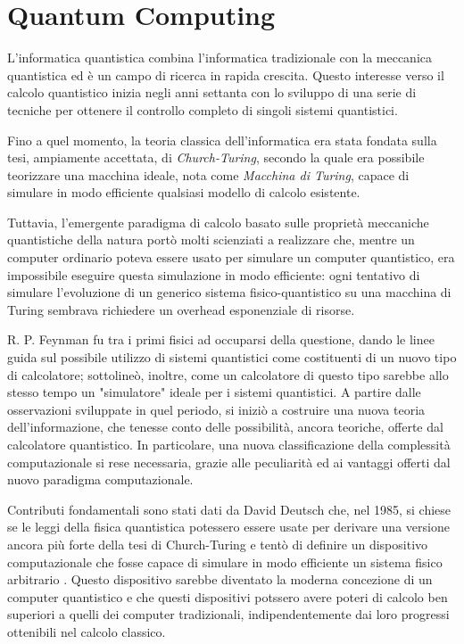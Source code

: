 \chapter{Quantum Computing}
L'informatica quantistica combina l'informatica tradizionale con la meccanica quantistica ed è un campo di ricerca in rapida crescita. Questo interesse verso il calcolo quantistico inizia negli anni settanta con lo sviluppo di una serie di tecniche per ottenere il controllo completo di singoli sistemi quantistici. 

Fino a quel momento, la teoria classica dell'informatica era stata fondata sulla tesi, ampiamente accettata, di \textit{Church-Turing}, secondo la quale era possibile teorizzare una macchina ideale, nota come \textit{Macchina di Turing}, capace di simulare in modo efficiente qualsiasi modello di calcolo esistente.

Tuttavia, l'emergente paradigma di calcolo basato sulle proprietà meccaniche quantistiche della natura portò molti scienziati a realizzare che, mentre un computer ordinario poteva essere usato per simulare un computer quantistico, era impossibile eseguire questa simulazione in modo efficiente: ogni tentativo di simulare l'evoluzione di un generico sistema fisico-quantistico su una macchina di Turing sembrava richiedere un overhead esponenziale di risorse.

R. P. Feynman fu tra i primi fisici ad occuparsi della questione, dando le linee guida sul possibile utilizzo di sistemi quantistici come costituenti di un nuovo tipo di calcolatore; sottolineò, inoltre, come un calcolatore di questo tipo sarebbe allo stesso tempo un "simulatore" ideale per i sistemi quantistici. A partire dalle osservazioni sviluppate in quel periodo, si iniziò a costruire una nuova teoria dell'informazione, che tenesse conto delle possibilità, ancora teoriche, offerte dal calcolatore quantistico. In particolare, una nuova classificazione della complessità computazionale si rese necessaria, grazie alle peculiarità ed ai vantaggi offerti dal nuovo paradigma computazionale.

Contributi fondamentali sono stati dati da David Deutsch che, nel 1985, si chiese se le leggi della fisica quantistica potessero essere usate per derivare una versione ancora più forte della tesi di Church-Turing e tentò di definire un dispositivo computazionale che fosse capace di simulare in modo efficiente un sistema fisico arbitrario \cite{deutsch1985quantum}. Questo dispositivo sarebbe diventato la moderna concezione di un computer quantistico e che questi dispositivi potssero avere poteri di calcolo ben superiori a quelli dei computer tradizionali, indipendentemente dai loro progressi ottenibili nel calcolo classico.

